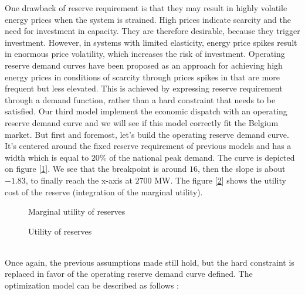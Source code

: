 
One drawback of reserve requirement is that they may result in highly volatile energy prices when the system is strained. High prices indicate scarcity and the need for investment in capacity. They are therefore desirable, because they trigger investment. However, in systems with limited elasticity, energy price spikes result in enormous price volatility, which increases the risk of investment. Operating reserve demand curves have been proposed as an approach for achieving high energy prices in conditions of scarcity through prices spikes in that are more frequent but less elevated. This is achieved by expressing reserve requirement through a demand function, rather than a hard constraint that needs to be satisfied. Our third model implement the economic dispatch with an operating reserve demand curve and we will see if this model correctly fit the Belgium market.
But first and foremost, let's build the operating reserve demand curve. It's centered around the fixed reserve requirement of previous models and has a width which is equal to $20 \%$ of the national peak demand. The curve is depicted on figure [\ref{fig:ReserveCurve}]. We see that the breakpoint is around $16$, then the slope is about $-1.83$, to finally reach the x-axis at $2700$ MW. The figure [\ref{fig:ReserveUtility}] shows the utility cost of the reserve (integration of the marginal utility).

\begin{minipage}{0.495\textwidth} 
\begin{figure}[H]
    \centering
    \setlength\fheight{3cm}
    \setlength{}
    
    \caption{Marginal utility of reserves}
    \label{fig:ReserveCurve}
\end{figure}
\end{minipage}
\begin{minipage}{0.495\textwidth} 
\begin{figure}[H]
    \centering
    \setlength\fheight{3cm}
    \setlength{}
    
    \caption{Utility of reserves}
    \label{fig:ReserveUtility}
\end{figure}
\end{minipage}\\


Once again, the previous assumptions made still hold, but the hard constraint is replaced in favor of the operating reserve demand curve defined. The optimization model can be described as follows : \\

